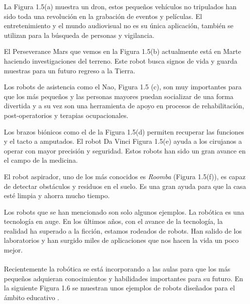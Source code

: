 La Figura 1.5(a) muestra un dron, estos pequeños vehículos no tripulados han sido toda una revolución en la grabación de eventos y películas. El entretenimiento y el mundo audiovisual no es su única aplicación, también se utilizan para la búsqueda de personas y vigilancia. 

El Perseverance Mars que vemos en la Figura 1.5(b) actualmente está en Marte haciendo investigaciones del terreno. Este robot busca signos de vida y guarda muestras para un futuro regreso a la Tierra.

Los robots de asistencia como el Nao, Figura 1.5 (c), son muy importantes para que los más pequeños y las personas mayores puedan socializar de una forma divertida y a su vez son una herramienta de apoyo en procesos de rehabilitación, post-operatorios y terapias ocupacionales.

Los brazos biónicos como el de la Figura 1.5(d) permiten recuperar las funciones y el tacto a amputados. El robot Da Vinci Figura 1.5(e) ayuda a los cirujanos a operar con mayor precisión y seguridad.  Estos robots han sido un gran avance en el campo de la medicina.

El robot aspirador, uno de los más conocidos es \textit{Roomba} (Figura 1.5(f)), es capaz de detectar obstáculos y residuos en el suelo. Es una gran ayuda para que la casa esté limpia y ahorra mucho tiempo.

Los robots que se han mencionado son solo algunos ejemplos. La robótica es una tecnología en auge. En los últimos años, con el avance de la tecnología, la realidad ha superado a la ficción, estamos rodeados de robots. Han salido de los laboratorios y han surgido miles de aplicaciones que nos hacen la vida un poco mejor.
\\
\\

Recientemente la robótica se está incorporando a las aulas para que los más pequeños adquieran conocimientos y habilidades importantes para su futuro. En la siguiente Figura 1.6 se muestran unos ejemplos de robots diseñados para el ámbito educativo \cite{roboticakids}.

